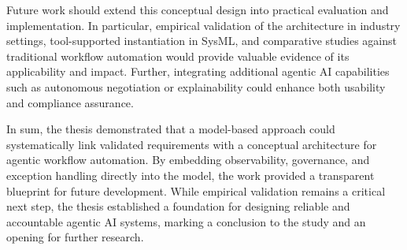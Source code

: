 Future work should extend this conceptual design into practical evaluation and implementation. In particular, empirical validation of the architecture in industry settings, tool-supported instantiation in SysML, and comparative studies against traditional workflow automation would provide valuable evidence of its applicability and impact. Further, integrating additional agentic AI capabilities such as autonomous negotiation or explainability could enhance both usability and compliance assurance.

In sum, the thesis demonstrated that a model-based approach could systematically link validated requirements with a conceptual architecture for agentic workflow automation. By embedding observability, governance, and exception handling directly into the model, the work provided a transparent blueprint for future development. While empirical validation remains a critical next step, the thesis established a foundation for designing reliable and accountable agentic AI systems, marking a conclusion to the study and an opening for further research.
